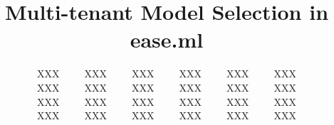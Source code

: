\documentclass[letterpaper]{vldb}
\begin{document}


\title{Multi-tenant Model Selection in ease.ml}

\author{
XXX~~~~~XXX~~~~~XXX~~~~~XXX~~~~~XXX~~~~~XXX\\
XXX~~~~~XXX~~~~~XXX~~~~~XXX~~~~~XXX~~~~~XXX\\
XXX~~~~~XXX~~~~~XXX~~~~~XXX~~~~~XXX~~~~~XXX\\
XXX~~~~~XXX~~~~~XXX~~~~~XXX~~~~~XXX~~~~~XXX
}

\maketitle
\end{document}
